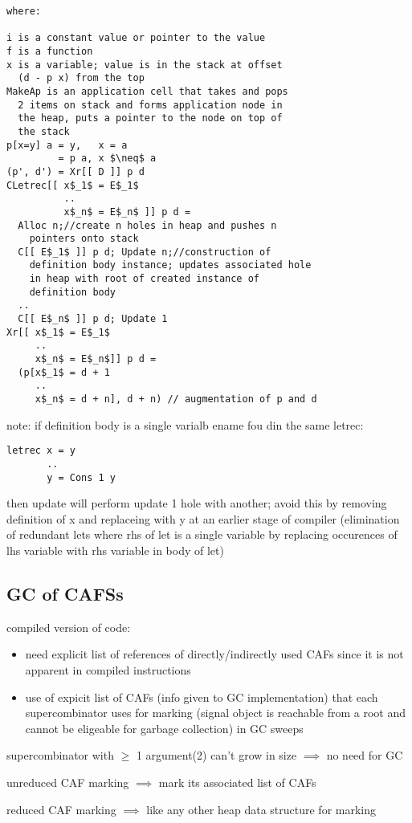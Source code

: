 \documentclass[8pt]{extarticle}
\begin{document}
\begin{multicols*}{2}
\begin{lstlisting}
where:

i is a constant value or pointer to the value
f is a function
x is a variable; value is in the stack at offset
  (d - p x) from the top
MakeAp is an application cell that takes and pops
  2 items on stack and forms application node in
  the heap, puts a pointer to the node on top of
  the stack
p[x=y] a = y,   x = a
         = p a, x $\neq$ a
(p', d') = Xr[[ D ]] p d
CLetrec[[ x$_1$ = E$_1$
          ..
          x$_n$ = E$_n$ ]] p d =
  Alloc n;//create n holes in heap and pushes n
    pointers onto stack
  C[[ E$_1$ ]] p d; Update n;//construction of
    definition body instance; updates associated hole
    in heap with root of created instance of
    definition body
  ..
  C[[ E$_n$ ]] p d; Update 1
Xr[[ x$_1$ = E$_1$
     ..
     x$_n$ = E$_n$]] p d =
  (p[x$_1$ = d + 1
     ..
     x$_n$ = d + n], d + n) // augmentation of p and d
\end{lstlisting}

note: if definition body is a single varialb ename fou din the same letrec:
\begin{lstlisting}
letrec x = y
       ..
       y = Cons 1 y
\end{lstlisting}
then update will perform update 1 hole with another; avoid this by removing definition of x and replaceing with y at an earlier stage of compiler (elimination of  redundant lets where rhs of let is a single variable by replacing occurences of lhs variable with rhs variable in body of let)

\subsection{GC of CAFSs}
compiled version of code:
\begin{itemize}
\item need explicit list of references of directly/indirectly used CAFs since it is not apparent in compiled instructions
\item use of expicit list of CAFs (info given to GC implementation) that each supercombinator uses for marking (signal object is reachable from a root and cannot be eligeable for garbage collection) in GC sweeps
\end{itemize}

supercombinator with $\geq$ 1 argument(2) can't grow in size $\implies$ no need for GC

unreduced CAF marking $\implies$ mark its associated list of CAFs

reduced CAF marking $\implies$ like any other heap data structure for marking


\end{multicols*}
\end{document}
